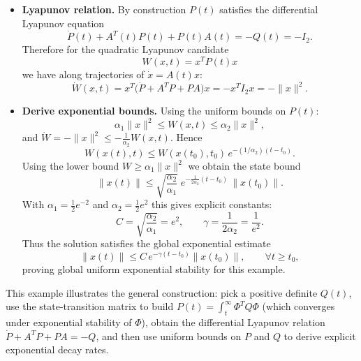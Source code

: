 \begin{example}
\begin{itemize}
    \item \textbf{Lyapunov relation.} By construction \(P(t)\) satisfies the differential Lyapunov equation
    \begin{equation}
    \dot P(t) + A^T(t)P(t) + P(t)A(t) = -Q(t) = -I_2.
    \end{equation}
    Therefore for the quadratic Lyapunov candidate
    \begin{equation}
    W(x,t)=x^T P(t) x
    \end{equation}
    we have along trajectories of \(\dot x = A(t)x\):
    \begin{equation}
    \dot W(x,t) = x^T\big(\dot P + A^TP + PA\big)x = -x^T I_2 x = -\|x\|^2.
    \end{equation}
    
    \item \textbf{Derive exponential bounds.} Using the uniform bounds on \(P(t)\):
    \begin{equation}
    \alpha_1 \|x\|^2 \le W(x,t) \le \alpha_2 \|x\|^2,
    \end{equation}
    and \(\dot W = -\|x\|^2 \le -\tfrac{1}{\alpha_2} W(x,t)\). Hence
    \begin{equation}
    W(x(t),t) \le W(x(t_0),t_0)\,e^{-(1/\alpha_2)(t-t_0)}.
    \end{equation}
    Using the lower bound \(W\ge \alpha_1 \|x\|^2\) we obtain the state bound
    \begin{equation}
    \|x(t)\| \le \sqrt{\frac{\alpha_2}{\alpha_1}}\; e^{-\tfrac{1}{2\alpha_2}(t-t_0)} \,\|x(t_0)\|.
    \end{equation}
    With \(\alpha_1=\tfrac{1}{2}e^{-2}\) and \(\alpha_2=\tfrac{1}{2}e^{2}\) this gives explicit constants:
    \begin{equation}
    C=\sqrt{\frac{\alpha_2}{\alpha_1}} = e^{2}, \qquad
    \gamma=\frac{1}{2\alpha_2} = \frac{1}{e^{2}}.
    \end{equation}
    Thus the solution satisfies the global exponential estimate
    \begin{equation}
    \|x(t)\| \le C\, e^{-\gamma (t-t_0)} \|x(t_0)\|,\qquad \forall t\ge t_0,
    \end{equation}
    proving global uniform exponential stability for this example.
\end{itemize}

\begin{remark}
This example illustrates the general construction: pick a positive definite \(Q(t)\), use the state-transition matrix to build \(P(t)=\int_t^\infty \Phi^T Q \Phi\) (which converges under exponential stability of \(\Phi\)), obtain the differential Lyapunov relation
\(\dot P + A^T P + P A = -Q\), and then use uniform bounds on \(P\) and \(Q\) to derive explicit exponential decay rates.
\end{remark}
\end{example}

